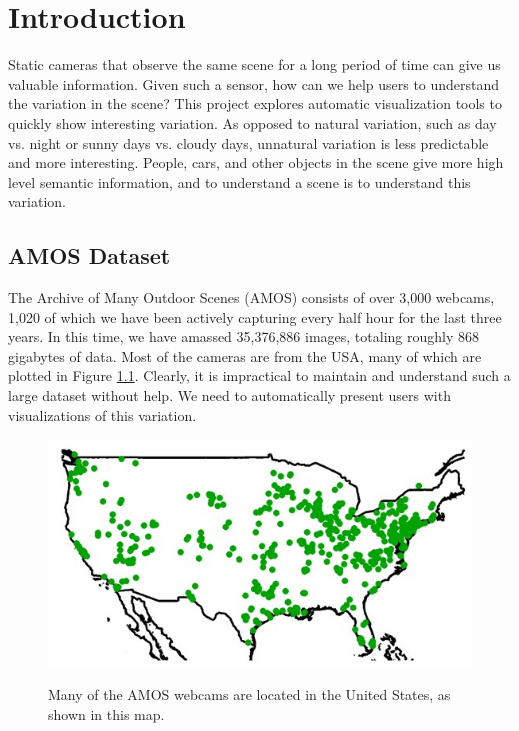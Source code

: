 \chapter{Introduction}
\label{cpt:intro}

Static cameras that observe the same scene for a long period of time can give us valuable information.  Given such a sensor, how can we help users to understand the variation in the scene?  This project explores automatic visualization tools to quickly show interesting variation.  As opposed to natural variation, such as day vs. night or sunny days vs. cloudy days, unnatural variation is less predictable and more interesting.  People, cars, and other objects in the scene give more high level semantic information, and to understand a scene is to understand this variation.


\section{AMOS Dataset}

The Archive of Many Outdoor Scenes (AMOS) consists of over 3,000 webcams, 1,020 of which we have been actively capturing every half hour for the last three years.  In this time, we have amassed 35,376,886 images, totaling roughly 868 gigabytes of data.  Most of the cameras are from the USA, many of which are plotted in Figure \ref{fig:localizationMap}.  Clearly, it is impractical to maintain and understand such a large dataset without help.  We need to automatically present users with visualizations of this variation.

\begin{figure}[ht]
\centering
\includegraphics[width = 1\textwidth]{figures/localizationMap.jpg}
\label{fig:localizationMap}
\caption[Map of known webcam locations from the AMOS dataset.]{Many of the AMOS webcams are located in the United States, as shown in this map.}
\end{figure}


